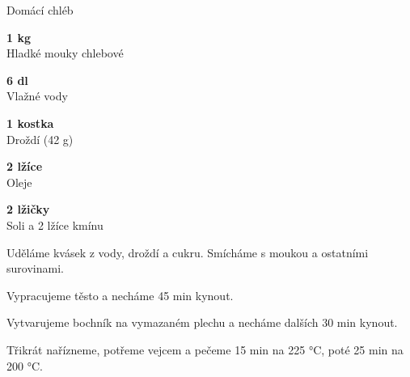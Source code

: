 \documentclass[11pt,a4paper]{article}
\begin{document}
\begin{recipe}[NavyBlue]{Domácí chléb}
    \begin{ingredients}
        \item \parbox[t]{\linewidth}{\raggedright \weight \textbf{1 kg}\\ Hladké mouky chlebové}
        \item \parbox[t]{\linewidth}{\raggedright \liquid \textbf{6 dl}\\ Vlažné vody}
        \item \parbox[t]{\linewidth}{\raggedright \piece \textbf{1 kostka}\\ Droždí (42 g)}
        \item \parbox[t]{\linewidth}{\raggedright \liquid \textbf{2 lžíce}\\ Oleje}
        \item \parbox[t]{\linewidth}{\raggedright \spoon \textbf{2 lžičky}\\ Soli a 2 lžíce kmínu}
    \end{ingredients}
    \begin{steps}
        \item Uděláme kvásek z vody, droždí a cukru. Smícháme s moukou a ostatními surovinami.
        \item Vypracujeme těsto a necháme 45 min kynout.
        \item Vytvarujeme bochník na vymazaném plechu a necháme dalších 30 min kynout.
        \item Třikrát nařízneme, potřeme vejcem a pečeme 15 min na 225 °C, poté 25 min na 200 °C.
    \end{steps}
\end{recipe}
\end{document}
